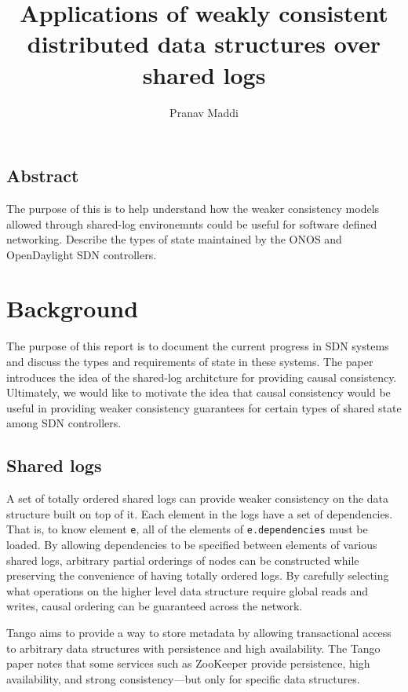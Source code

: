 \documentclass[letterpaper,twocolumn,10pt]{article}
\begin{document}
\title{\Large Applications of weakly consistent distributed data structures over shared logs}

\author{Pranav Maddi}

\date{}
\maketitle

\tableofcontents

\subsection*{Abstract}

The purpose of this is to help understand how the weaker consistency models allowed through shared-log environemnts could be useful for software defined networking.
Describe the types of state maintained by the ONOS and OpenDaylight SDN controllers.

\section{Background}

The purpose of this report is to document the current progress in SDN systems and discuss the types and requirements of state in these systems. The paper introduces the idea of the shared-log architcture for providing causal consistency. Ultimately, we would like to motivate the idea that causal consistency would be useful in providing weaker consistency guarantees for certain types of shared state among SDN controllers.

\subsection{Shared logs}

A set of totally ordered shared logs can provide weaker consistency on the data structure built on top of it. Each element in the logs have a set of dependencies. That is, to know element \verb_e_, all of the elements of \verb_e.dependencies_ must be loaded.  By allowing dependencies to be specified between elements of various shared logs, arbitrary partial orderings of nodes can be constructed while preserving the convenience of having totally ordered logs. By carefully selecting what operations on the higher level data structure require global reads and writes, causal ordering can be guaranteed across the network.

Tango \cite{Tango} aims to provide a way to store metadata by allowing transactional access to arbitrary data structures with persistence and high availability. The Tango paper notes that some services such as ZooKeeper \cite{hunt2010zookeeper} provide persistence, high availability, and strong consistency---but only for specific data structures.
\end{document}
